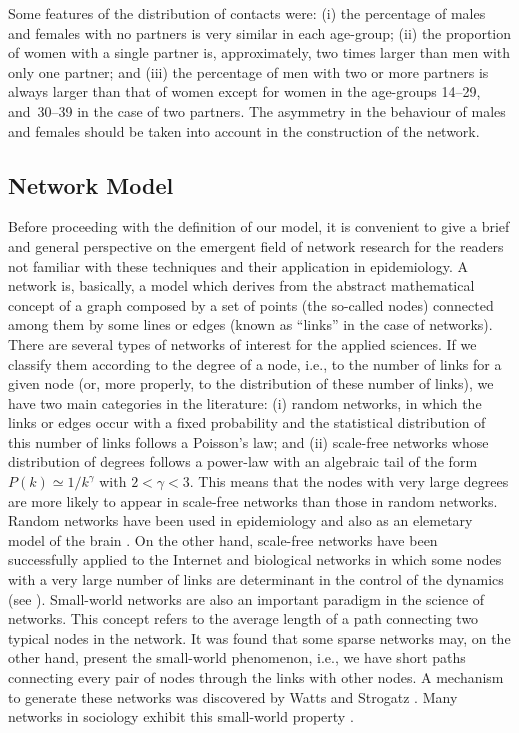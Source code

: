 Some features of the distribution of contacts were: (i) the percentage of males and females with no partners is
very similar in each age-group; (ii) the proportion of women  with a single partner is, approximately, two times larger than men with only one partner; and (iii) the percentage of men with two or more partners is always larger than that of women except for women in the age-groups 14--29, and~30--39 in the case of two partners. The asymmetry in the behaviour of males and females should be taken into account in the construction of the network.

\subsection{Network Model}

Before proceeding with the definition of our model, it is convenient to give a brief and general perspective on the emergent field
of network research for the readers not familiar with these techniques and their application in epidemiology. A network is, basically, a model which derives from the abstract mathematical concept of a graph composed by a set of points (the so-called nodes) connected among them by some lines or edges (known as ``links'' in the case of networks).
There are several types of networks of interest for the applied sciences. If we classify them according to the degree of a node, i.e., to the number of links for a given node (or, more properly, to the distribution of these number of links), we have two main categories in the literature: (i) random networks, in which the links or edges occur with a fixed probability and the statistical distribution of this number of links follows a Poisson's law; and (ii) scale-free networks whose distribution of degrees follows a power-law with an
algebraic tail of the form $P(k) \simeq 1/k^\gamma$ with $2 < \gamma < 3$. This means that the nodes with very large degrees are more likely to appear in scale-free networks than those in random networks. Random networks have been used in epidemiology
\cite{acedo2011using} and also as an elemetary model of the brain \cite{acedo2013brain}. On the other hand, scale-free networks have been successfully applied to the Internet and biological networks in which some nodes with a very large number of links are determinant in the control of the dynamics (see \cite{dorogovtsev2013evolution}). Small-world networks are also an important paradigm in the science of networks. This concept refers to the average length of a path connecting two typical nodes in the network. It was found that some sparse networks may, on the other hand, present the small-world phenomenon, i.e., we have short paths connecting every pair of nodes through the links with other nodes. A mechanism to generate these networks was discovered by
Watts and Strogatz \cite{watts1998collective}. Many networks in sociology exhibit this small-world property \cite{christakis2007spread,liljeros2001web,bearman2004chains}.

